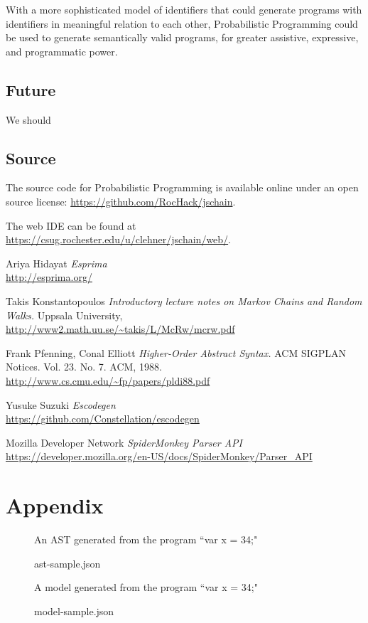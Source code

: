 \documentclass{article}
\begin{document}
With a more sophisticated model of identifiers that could generate programs with
identifiers in meaningful relation to each other, Probabilistic Programming could
be used to generate semantically valid programs, for greater assistive,
expressive, and programmatic power.

\subsection{Future}

We should 

\subsection{Source}

The source code for Probabilistic Programming is available online under an open
source license:
\url{https://github.com/RocHack/jschain}.

The web IDE can be found at
\url{https://csug.rochester.edu/u/clehner/jschain/web/}.

\begin{thebibliography}{1}

	 Ariya Hidayat {\em Esprima}
		\\\url{http://esprima.org/}

	 Takis Konstantopoulos {\em Introductory lecture notes on
		Markov Chains and Random Walks.} Uppsala University,
		\\\url{http://www2.math.uu.se/~takis/L/McRw/mcrw.pdf}

	 Frank Pfenning, Conal Elliott
		{\em Higher-Order Abstract Syntax.}
		ACM SIGPLAN Notices. Vol. 23. No. 7. ACM, 1988.
		\\\url{http://www.cs.cmu.edu/~fp/papers/pldi88.pdf}

	 Yusuke Suzuki {\em Escodegen}
		\\\url{https://github.com/Constellation/escodegen}

	 Mozilla Developer Network {\em SpiderMonkey Parser API}
		\\\url{https://developer.mozilla.org/en-US/docs/SpiderMonkey/Parser_API}

\end{thebibliography}

\clearpage
\section*{Appendix}

\begin{figure}[h!]
	\caption{ast-sample.json}
	\label{fig:sample-ast}
	\centering
	An AST generated from the program ``var x = 34;"

	
\end{figure}

\begin{figure}[h!]
	\caption{model-sample.json}
	\label{fig:sample-model}
	\centering
	A model generated from the program ``var x = 34;"

	
\end{figure}
\end{document}
